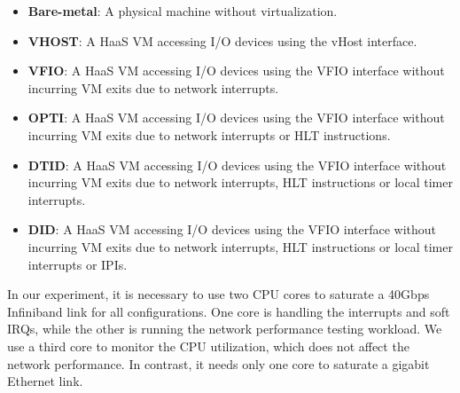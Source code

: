 \begin{itemize}
\setlength\itemsep{-0.04in}
\item {\bf Bare-metal}: A physical machine without
                        virtualization.

\item {\bf VHOST}: A HaaS VM accessing I/O devices using the
                   vHost interface.

\item {\bf VFIO}: A HaaS VM accessing I/O devices using the
                  VFIO interface without incurring VM exits
                  due to network interrupts.

\item {\bf OPTI}: A HaaS VM accessing I/O devices using the
                  VFIO interface without incurring VM exits
                  due to network interrupts or HLT
                  instructions.

\item{\bf  DTID}: A HaaS VM accessing I/O devices using the
                  VFIO interface without incurring VM exits
                  due to network interrupts, HLT instructions
                  or local timer interrupts.

\item{\bf  DID}: A HaaS VM accessing I/O devices using the
                 VFIO interface without incurring VM exits due
                 to network interrupts, HLT instructions or
                 local timer interrupts or IPIs.
\end{itemize}




In our experiment, it is necessary to use two CPU cores to
saturate a 40Gbps Infiniband link for all configurations. One
core is handling the interrupts and soft IRQs, while the other
is running the network performance testing workload. We use a third
core to monitor the CPU utilization, which does not
affect the network performance. In contrast, it needs only one
core to saturate a gigabit Ethernet link.
